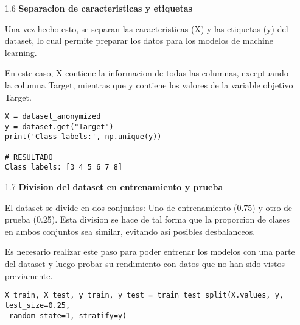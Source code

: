 \documentclass{article}
\begin{document}
\newpage

\begin{itemize}

\item[1.6]  {\bf Separacion de caracteristicas y etiquetas}

Una vez hecho esto, se separan las caracteristicas (X) y las etiquetas (y) del dataset, lo cual permite preparar los datos para los modelos de machine learning.

En este caso, X contiene la informacion de todas las columnas, exceptuando la columna Target, mientras que y contiene los valores de la variable objetivo Target.

\begin{tcolorbox}[width=14cm]
\begin{scriptsize}
\begin{verbatim}
X = dataset_anonymized
y = dataset.get("Target")
print('Class labels:', np.unique(y))

# RESULTADO
Class labels: [3 4 5 6 7 8]
\end{verbatim}
\end{scriptsize}
\end{tcolorbox}

\end{itemize}

\bigskip

\begin{itemize}

\item[1.7]  {\bf Division del dataset en entrenamiento y prueba}

El dataset se divide en dos conjuntos: Uno de entrenamiento (0.75) y otro de prueba (0.25). Esta division se hace de tal forma que la proporcion de clases en ambos conjuntos sea similar, evitando asi posibles desbalanceos.

Es necesario realizar este paso para poder entrenar los modelos con una parte del dataset y luego probar su rendimiento con datos que no han sido vistos previamente.

\begin{tcolorbox}[width=14cm]
\begin{scriptsize}
\begin{verbatim}
X_train, X_test, y_train, y_test = train_test_split(X.values, y, test_size=0.25,
 random_state=1, stratify=y)
\end{verbatim}
\end{scriptsize}
\end{tcolorbox}

\end{itemize}
\end{document}
